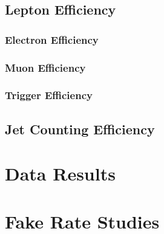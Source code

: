 \documentclass{cmspaper}
\begin{document}
     \subsection{Lepton Efficiency}
     \label{sec:efficiency}
     
	 \subsubsection{Electron Efficiency}
	 \label{sec:eff_electron}
	 
	 \subsubsection{Muon Efficiency}
	 \label{sec:eff_muon}
	 
	 \subsubsection{Trigger Efficiency}
	 \label{sec:eff_trigger}
	 
     \subsection{Jet Counting Efficiency}
     

%   

\clearpage
\section{Data Results}
   \label{sec:dataresults}
   

%     

\clearpage


\clearpage 
\appendix
\appendixpage
  \section{Fake Rate Studies}
     \label{app:fake_rate_studies}
 
\end{document}
